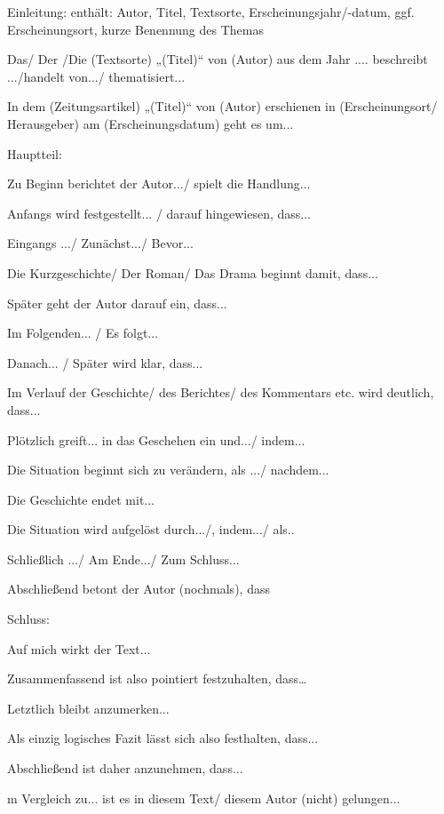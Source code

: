 Einleitung:
enthält: Autor, Titel, Textsorte, Erscheinungsjahr/-datum, ggf. Erscheinungsort, kurze Benennung des Themas 
\begin{compactitem}
    \item Das/ Der /Die (Textsorte) „(Titel)“ von (Autor) aus dem Jahr .... beschreibt .../handelt von.../ thematisiert...  
    \item In dem (Zeitungsartikel) „(Titel)“ von (Autor) erschienen in (Erscheinungsort/ Herausgeber) am (Erscheinungsdatum) geht es um... 
\end{compactitem}
Hauptteil: 
\begin{compactitem}
    \item  Zu Beginn berichtet der Autor.../ spielt die Handlung... 
    \item  Anfangs wird festgestellt... / darauf hingewiesen, dass...
    \item  Eingangs .../ Zunächst.../ Bevor...
    \item Die Kurzgeschichte/ Der Roman/ Das Drama beginnt damit, dass... 
    \item Später geht der Autor darauf ein, dass... 
    \item  Im Folgenden... / Es folgt...
    \item Danach... / Später wird klar, dass...
    \item Im Verlauf der Geschichte/ des Berichtes/ des Kommentars etc. wird deutlich, dass...
    \item Plötzlich greift... in das Geschehen ein und.../ indem...
    \item  Die Situation beginnt sich zu verändern, als .../ nachdem... 
    \item Die Geschichte endet mit...
    \item Die Situation wird aufgelöst durch.../, indem.../ als..
    \item Schließlich .../ Am Ende.../ Zum Schluss... 
    \item Abschließend betont der Autor (nochmals), dass 
\end{compactitem}

Schluss:
\begin{compactitem}
    \item  Auf mich wirkt der Text... 
    \item  Zusammenfassend ist also pointiert festzuhalten, dass… 
    \item Letztlich bleibt anzumerken... 
    \item Als einzig logisches Fazit lässt sich also festhalten, dass...
    \item Abschließend ist daher anzunehmen, dass... 
    \item m Vergleich zu... ist es in diesem Text/ diesem Autor (nicht) gelungen... 
\end{compactitem}

